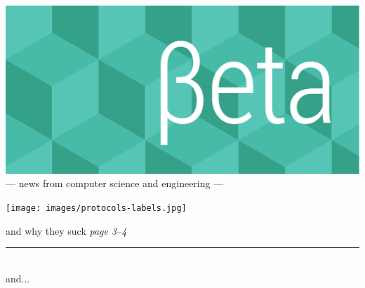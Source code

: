 \documentclass[twoside]{article}
\date{29 July 2015}
\begin{document}
\thispagestyle{empty}
\begingroup%
\vspace*{-3.5cm}\centering\hspace*{-2.8cm}%
\includegraphics[trim=0mm 20mm 0mm 0mm, clip, width=22cm]{../../style/beta-logo.pdf}%
\vspace{1em}
{\sffamily\fontsize{32pt}{32pt}\selectfont --- news from computer science and engineering ---}
\endgroup\vspace*{3ex}

\center
\texttt{[image: images/protocols-labels.jpg]}

{\sffamily\fontsize{24pt}{24pt}\selectfont {\bfseries ``intuitive'' protocols} and why they suck}%
\hfill{\rmfamily\fontsize{14pt}{14pt}\selectfont\it page 3--4}
\endcenter

\vfill\center\rule[4pt]{0.75\linewidth}{0.75pt}\\ {\sffamily\fontsize{24pt}{24pt}\selectfont and...}\endcenter\vfill
\end{document}
